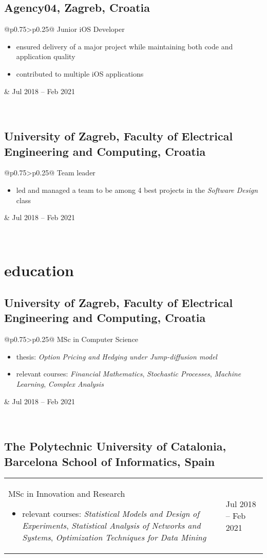 \documentclass[a4paper]{article}
\makeatletter
\newlength{\tablewidth}
\newenvironment{period}[2]{%
\newcommand{\sarma}{#2}%
\setlength{\tablewidth}{\linewidth}
\addtolength{\tablewidth}{-2\tabcolsep}
\begin{tabular}{@{}p{0.75\tablewidth}>{\raggedleft\arraybackslash}p{0.25\tablewidth}@{}}%
#1 \newline
\begin{itemize}
}{%
\end{itemize} & \sarma \\%
\end{tabular}\\
}
\makeatother
\begin{document}
\subsection{Agency04, Zagreb, Croatia}
\begin{period}{Junior iOS Developer}{Jul 2018 -- Feb 2021}
    \item
        ensured delivery of a major project while maintaining both code and application quality
    \item
        contributed to multiple iOS applications
\end{period}

\subsection{University of Zagreb, Faculty of Electrical Engineering and Computing, Croatia}
\begin{period}{Team leader}{Sep 2018 -- Jan 2019}
    \item led and managed a team to be among 4 best projects in the \textit{Software Design} class
\end{period}

\section{education}
\subsection{University of Zagreb, Faculty of Electrical Engineering and Computing, Croatia}
\begin{period}{MSc in Computer Science}{Sep 2019 -- July 2022}
    \item thesis:
        \textit{Option Pricing and Hedging under Jump-diffusion model}
    \item relevant courses:
        \textit{Financial Mathematics},
        \textit{Stochastic Processes},
        \textit{Machine Learning},
        \textit{Complex Analysis}
\end{period}
\subsection{The Polytechnic University of Catalonia, Barcelona School of Informatics, Spain}
\begin{period}{MSc in Innovation and Research}{Sep 2020 -- Jan 2021}
    \item relevant courses:
        \textit{Statistical Models and Design of Experiments},
        \textit{Statistical Analysis of Networks and Systems},
        \textit{Optimization Techniques for Data Mining}
\end{period}
\end{document}
